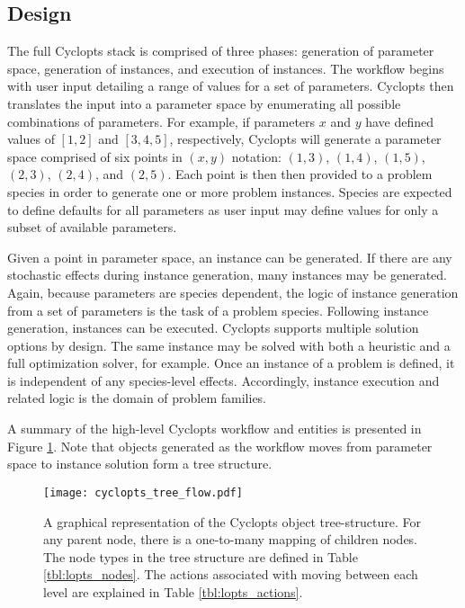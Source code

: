 \subsection{Design}\label{method:tools:struc}

The full Cyclopts stack is comprised of three phases: generation of parameter
space, generation of instances, and execution of instances. The workflow begins
with user input detailing a range of values for a set of parameters. Cyclopts
then translates the input into a parameter space by enumerating all possible
combinations of parameters. For example, if parameters $x$ and $y$ have defined
values of $[1, 2]$ and $[3, 4, 5]$, respectively, Cyclopts will generate a
parameter space comprised of six points in $(x, y)$ notation: $(1, 3)$, $(1,
4)$, $(1, 5)$, $(2, 3)$, $(2, 4)$, and $(2, 5)$. Each point is then then
provided to a problem species in order to generate one or more problem
instances. Species are expected to define defaults for all parameters as user
input may define values for only a subset of available parameters.

Given a point in parameter space, an instance can be generated. If there are any
stochastic effects during instance generation, many instances may be
generated. Again, because parameters are species dependent, the logic of
instance generation from a set of parameters is the task of a problem
species. Following instance generation, instances can be executed. Cyclopts
supports multiple solution options by design. The same instance may be solved
with both a heuristic and a full optimization solver, for example. Once an
instance of a problem is defined, it is independent of any species-level
effects. Accordingly, instance execution and related logic is the domain of
problem families.

A summary of the high-level Cyclopts workflow and entities is presented in
Figure \ref{fig:lopts_desgin}. Note that objects generated as the workflow moves
from parameter space to instance solution form a tree structure.

\begin{figure}
  \begin{center}
    \texttt{[image: cyclopts\_tree\_flow.pdf]}
    \caption{
      \label{fig:lopts_desgin}
      A graphical representation of the Cyclopts object tree-structure. For any
      parent node, there is a one-to-many mapping of children nodes. The node
      types in the tree structure are defined in Table
      \ref{tbl:lopts_nodes}. The actions associated with moving between each
      level are explained in Table \ref{tbl:lopts_actions}.}
  \end{center}
\end{figure}

